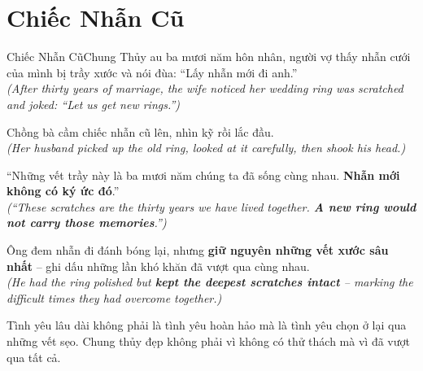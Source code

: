 \section{Chiếc Nhẫn Cũ}
\begin{truyen}{Chiếc Nhẫn Cũ}{Chung Thủy}
au ba mươi năm hôn nhân, người vợ thấy nhẫn cưới của mình bị trầy xước và nói đùa: ``Lấy nhẫn mới đi anh.''\\
\textit{(After thirty years of marriage, the wife noticed her wedding ring was scratched and joked: ``Let us get new rings.'')}

Chồng bà cầm chiếc nhẫn cũ lên, nhìn kỹ rồi lắc đầu.\\
\textit{(Her husband picked up the old ring, looked at it carefully, then shook his head.)}

``Những vết trầy này là ba mươi năm chúng ta đã sống cùng nhau. \textbf{Nhẫn mới không có ký ức đó}.''\\
\textit{(``These scratches are the thirty years we have lived together. \textbf{A new ring would not carry those memories}.'')}

Ông đem nhẫn đi đánh bóng lại, nhưng \textbf{giữ nguyên những vết xước sâu nhất} – ghi dấu những lần khó khăn đã vượt qua cùng nhau.\\
\textit{(He had the ring polished but \textbf{kept the deepest scratches intact} – marking the difficult times they had overcome together.)}
\end{truyen}
\begin{baihoc}
  Tình yêu lâu dài không phải là tình yêu hoàn hảo mà là tình yêu chọn ở lại qua những vết sẹo. Chung thủy đẹp không phải vì không có thử thách mà vì đã vượt qua tất cả.
\end{baihoc}

